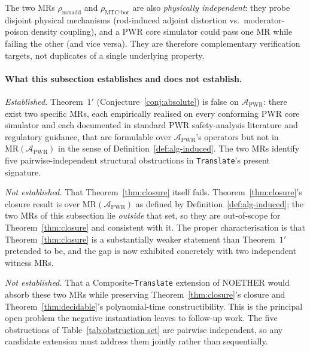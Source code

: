 \documentclass[acmsmall,screen,review]{acmart}
\begin{document}
The two MRs $\rho_{\mathrm{nonadd}}$ and $\rho_{\mathrm{MTC\text{-}bor}}$ are also \emph{physically independent}: they probe disjoint physical mechanisms (rod-induced adjoint distortion vs.\ moderator-poison density coupling), and a PWR core simulator could pass one MR while failing the other (and vice versa). They are therefore complementary verification targets, not duplicates of a single underlying property.

\paragraph{What this subsection establishes and does not establish.}
\emph{Established.} Theorem~$1'$ (Conjecture~\ref{conj:absolute}) is false on $\mathcal{A}_{\mathrm{PWR}}$: there exist two specific MRs, each empirically realised on every conforming PWR core simulator and each documented in standard PWR safety-analysis literature and regulatory guidance, that are formulable over $\mathcal{A}_{\mathrm{PWR}}$'s operators but not in $\mathrm{MR}(\mathcal{A}_{\mathrm{PWR}})$ in the sense of Definition~\ref{def:alg-induced}. The two MRs identify five pairwise-independent structural obstructions in \texttt{Translate}'s present signature.

\emph{Not established.} That Theorem~\ref{thm:closure} itself fails. Theorem~\ref{thm:closure}'s closure result is over $\mathrm{MR}(\mathcal{A}_{\mathrm{PWR}})$ as defined by Definition~\ref{def:alg-induced}; the two MRs of this subsection lie \emph{outside} that set, so they are out-of-scope for Theorem~\ref{thm:closure} and consistent with it. The proper characterisation is that Theorem~\ref{thm:closure} is a substantially weaker statement than Theorem~$1'$ pretended to be, and the gap is now exhibited concretely with two independent witness MRs.

\emph{Not established.} That a Composite-\texttt{Translate} extension of NOETHER would absorb these two MRs while preserving Theorem~\ref{thm:closure}'s closure and Theorem~\ref{thm:decidable}'s polynomial-time constructibility. This is the principal open problem the negative instantiation leaves to follow-up work. The five obstructions of Table~\ref{tab:obstruction set} are pairwise independent, so any candidate extension must address them jointly rather than sequentially.


\end{document}
